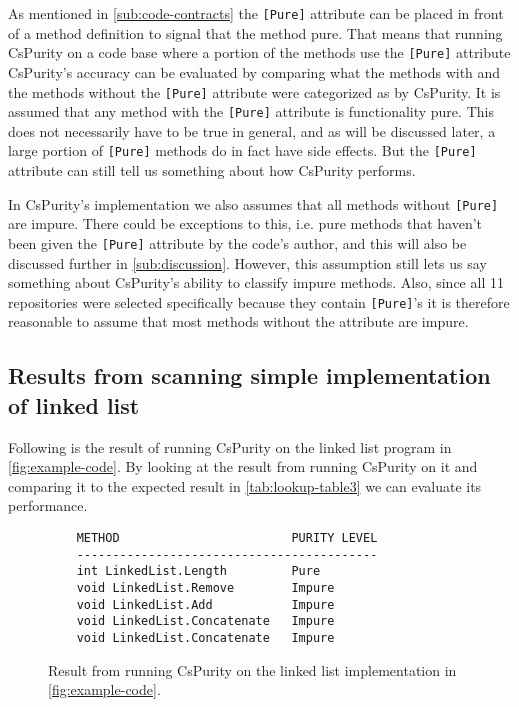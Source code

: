 \documentclass[a4paper,12pt]{article}
\begin{document}
As mentioned in \autoref{sub:code-contracts} the \texttt{[Pure]} attribute can be placed in front of a method definition to signal that the method pure. That means that running CsPurity on a code base where a portion of the methods use the \texttt{[Pure]} attribute CsPurity's accuracy can be evaluated by comparing what the methods with and the methods without the \texttt{[Pure]} attribute were categorized as by CsPurity. It is assumed that any method with the \texttt{[Pure]} attribute is functionality pure. This does not necessarily have to be true in general, and as will be discussed later, a large portion of \texttt{[Pure]} methods do in fact have side effects. But the \texttt{[Pure]} attribute can still tell us something about how CsPurity performs.

In CsPurity's implementation we also assumes that all methods without \texttt{[Pure]} are impure. There could be exceptions to this, i.e. pure methods that haven't been given the \texttt{[Pure]} attribute by the code's author, and this will also be discussed further in \autoref{sub:discussion}. However, this assumption still lets us say something about CsPurity's ability to classify impure methods. Also, since all 11 repositories were selected specifically because they contain \texttt{[Pure]}'s it is therefore reasonable to assume that most methods without the attribute are impure.

\subsection{Results from scanning simple implementation of linked list} \label{sub:results-from-scanning-the-example-list}

Following is the result of running CsPurity on the linked list program in \autoref{fig:example-code}. By looking at the result from running CsPurity on it and comparing it to the expected result in \autoref{tab:lookup-table3} we can evaluate its performance.

\begin{figure}[htpb]
  \centering
  \begin{minipage}{\linewidth} %
    \begin{lstlisting}
    METHOD                        PURITY LEVEL
    ------------------------------------------
    int LinkedList.Length         Pure
    void LinkedList.Remove        Impure
    void LinkedList.Add           Impure
    void LinkedList.Concatenate   Impure
    void LinkedList.Concatenate   Impure
    \end{lstlisting}
  \end{minipage}
  \caption{Result from running CsPurity on the linked list implementation in \autoref{fig:example-code}.}
  \label{fig:example-result}
\end{figure}
\end{document}
